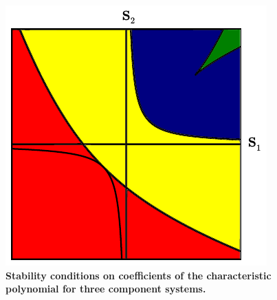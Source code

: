 \documentclass{amsart}
\theoremstyle{definition}
\theoremstyle{remark}
\numberwithin{equation}{section}
\begin{document}
\begin{figure}[!ht]
\centering
\noindent\includegraphics[width=0.5\columnwidth]{fig/region3x3.pdf}
\caption{{\bf Stability conditions on coefficients of the characteristic polynomial for three component systems.} }
\label{fig:region3x3}
\end{figure}








\end{document}
